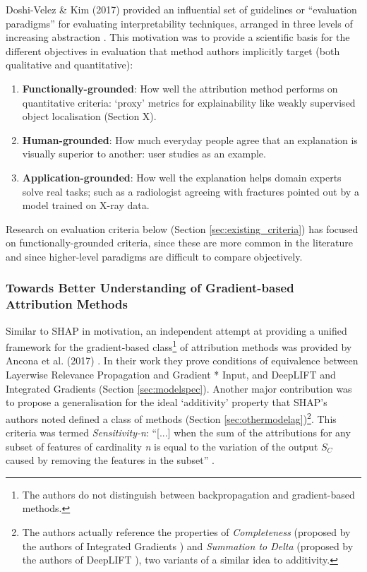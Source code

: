 \documentclass[main]{subfiles}
\begin{document}
Doshi-Velez \& Kim (2017) provided an influential set of guidelines or ``evaluation paradigms'' for evaluating interpretability techniques, arranged in three levels of increasing abstraction \cite{paradigms}. This motivation was to provide a scientific basis for the different objectives in evaluation that method authors implicitly target (both qualitative and quantitative):

\begin{enumerate}
\item \textbf{Functionally-grounded}: How well the attribution method performs on quantitative criteria: `proxy' metrics for explainability like weakly supervised object localisation (Section X).
\item \textbf{Human-grounded}: How much everyday people agree that an explanation is visually superior to another: user studies as an example.
\item \textbf{Application-grounded}: How well the explanation helps domain experts solve real tasks; such as a radiologist agreeing with fractures pointed out by a model trained on X-ray data.

\end{enumerate}

Research on evaluation criteria below (Section \ref{sec:existing_criteria}) has focused on functionally-grounded criteria, since these are more common in the literature and since higher-level paradigms are difficult to compare objectively.

\subsubsection{Towards Better Understanding of Gradient-based Attribution Methods \cite{ancona}}
Similar to SHAP in motivation, an independent attempt at providing a unified framework for the gradient-based class\footnote{The authors do not distinguish between backpropagation and gradient-based methods.} of attribution methods was provided by Ancona et al. (2017) \cite{ancona}. In their work they prove conditions of equivalence between Layerwise Relevance Propagation and Gradient * Input, and DeepLIFT and Integrated Gradients (Section \ref{sec:modelspec}). Another major contribution was to propose a generalisation for the ideal `additivity' property that SHAP's authors noted defined a class of methods (Section \ref{sec:othermodelag})\footnote{The authors actually reference the properties of \textit{Completeness} (proposed by the authors of Integrated Gradients \cite{integrated}) and \textit{Summation to Delta} (proposed by the authors of DeepLIFT \cite{deeplift}), two variants of a similar idea to additivity.}. This criteria was termed \textit{Sensitivity-n}: ``[...] when the sum of the attributions for any subset of features of cardinality \textit{n} is equal to the variation of the output $S_{C}$ caused by removing the features in the subset'' \cite{ancona}.
\end{document}
